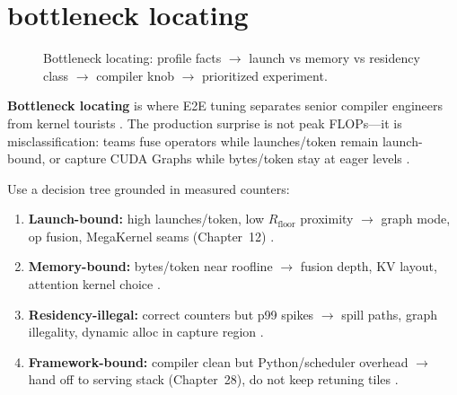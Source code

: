 \section{bottleneck locating}
\label{sec:ch22_bottleneck_locating}


\begin{figure}[t]
\centering
{}
\caption{Bottleneck locating: profile facts $\rightarrow$ launch vs memory vs residency class $\rightarrow$ compiler knob $\rightarrow$ prioritized experiment.}
\label{fig:bottleneck_locating_architecture}
\end{figure}

\textbf{Bottleneck locating} is where E2E tuning separates senior compiler engineers from kernel tourists \citep{patel2025llminference,dlbook,chen2020compilerbasedhardw}. The production surprise is not peak FLOPs---it is misclassification: teams fuse operators while launches/token remain launch-bound, or capture CUDA Graphs while bytes/token stay at eager levels \citep{memoryfloor2026,nvidia2024cudagraphs,taxbreak2026,yirage2026}.

Use a decision tree grounded in measured counters:
\begin{enumerate}
\item \textbf{Launch-bound:} high launches/token, low $R_{\mathrm{floor}}$ proximity $\rightarrow$ graph mode, op fusion, MegaKernel seams (Chapter~12) \citep{nvidia2024cudagraphs,memoryfloor2026,taxbreak2026,yirage2026}.
\item \textbf{Memory-bound:} bytes/token near roofline $\rightarrow$ fusion depth, KV layout, attention kernel choice \citep{dao2022flashattention,dao2023flashdecoding,semianalysis2024tma,memoryfloor2026}.
\item \textbf{Residency-illegal:} correct counters but p99 spikes $\rightarrow$ spill paths, graph illegality, dynamic alloc in capture region \citep{nvidia2024cudagraphs,kwon2023vllm,patel2025llminference,yirage2026}.
\item \textbf{Framework-bound:} compiler clean but Python/scheduler overhead $\rightarrow$ hand off to serving stack (Chapter~28), do not keep retuning tiles \citep{kwon2023vllm,patel2025llminference,taxbreak2026}.
\end{enumerate}

